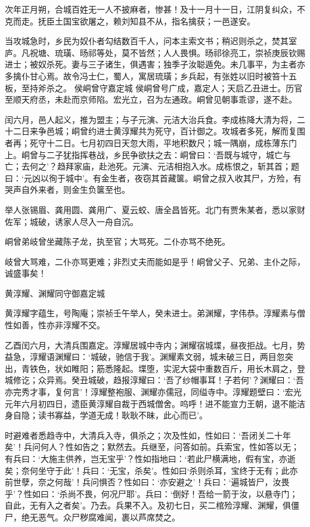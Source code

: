 \documentclass[]{article}
\begin{document}
次年正月朔，合城百姓无一人不披麻者，惨甚！及十一月十一日，江阴复纠众，不克而走。抚臣土国宝欲屠之，赖刘知县不从，指名擒获；一邑遂安。

当攻城急时，乡民为奴仆者勾结数百千人，问本主索文书；稍迟则杀之，焚其室庐。凡祝塘、琉璜、旸祁等处，莫不皆然；人人畏惧。旸祁徐亮工，崇祯庚辰钦赐进士；被奴杀死。妻与三子诸生，俱遇害；独季子汝聪遁免。未几事平，为主者亦多擒仆甘心焉。故令冯士仁，蜀人，寓居琉璜；乡兵起，有张姓以旧时被笞十五板，至持斧杀之。
侯峒曾守嘉定城
侯峒曾号广成，嘉定人；天启乙丑进士。历官至顺天府丞，未赴而京师陷。宏光立，召为左通政。峒曾见朝事乖谬，遂不赴。

闰六月，邑人起义，推为盟主；与子元演、元洁大治兵食。李成栋降大清为将，二十二日来争邑城；峒曾约进士黄淳耀共为死守，百计御之。攻城者多死，解而复围者再；死守十二日。七月初四日天忽大雨，平地积数尺；城一隅崩，成栋薄东门上。峒曾与二子犹指挥巷战，乡民争欲扶之去：峒曾曰：`吾既与城守，城亡与亡；去何之'？趋拜家庙，赴池死。元演、元洁相抱入水。成栋恨之，斩其首；题曰：`元凶以徇于城中'。有金生者，夜窃其首藏箧。峒曾之叔入收其尸，方殓，有哭声自外来者，则金生负箧至也。

举人张锡眉、龚用圆、龚用广、夏云蛟、唐全昌皆死。北门有贾朱某者，悉以家财佐军；城破，诱家人尽入一舟自沉。

峒曾弟岐曾坐藏陈子龙，执至官；大骂死。二仆亦骂不绝死。

岐曾大骂难，二仆亦骂更难；非烈丈夫而能如是乎！峒曾父子、兄弟、主仆之际，诚盛事矣！

黄淳耀、渊耀同守御嘉定城

黄淳耀字蕴生，号陶庵；崇祯壬午举人，癸未进士。弟渊耀，字伟恭。淳耀素与僧性如善，性亦非淳耀不交。

乙酉闰六月，大清兵围嘉定。淳耀居城中寺内；渊耀宿城堞，昼夜拒战。七月，势益急，淳耀语渊耀曰：`城破，驰信于我'。渊耀素文弱，城未破三日，两目忽突出，青铁色，状如睢阳；筋悉隆起。堞堕，实泥大袋中重数百斤，用长木肩之，登城修讫；众异焉。癸丑城破，趋报淳耀曰：`吾了纱帽事耳！子若何'？渊耀曰：`吾亦完秀才事，复何言'！淳耀整袍服、渊耀亦儒冠，同缢寺中。淳耀题壁曰：`宏光元年六月初四日，遗臣黄淳耀自裁于西城僧舍。呜呼！进不能宣力王朝，退不能洁身自隐；读书寡益，学道无成！耿耿不昧，此心而已'。

时避难者悉趋寺中，大清兵入寺，俱杀之；次及性如，性如曰：`吾闭关二十年矣'！兵问何人？性如告之；默然去。兵继至，问答如前。兵索宝，性如答以无；有兵曰：`大施主供养，岂无宝乎'？性如指地曰：`若此尸横满地，假有宝，亦逝矣；奈何坐守于此'！兵曰：`无宝，杀矣'。性如曰`杀则杀耳，宝终于无有；此亦前世孽，奈之何哉'！兵问惧否？性如曰：`亦安避之'！兵曰：`遍城皆尸，汝畏乎'？性如曰：`杀尚不畏，何况尸耶'。兵曰：`倒好！吾给一箭于汝，以悬寺门；自此，无有入之者矣'。乃去。兵果不入。及初七日，买二棺殓淳耀、渊耀，俱僵尸，绝无恶气。众尸秽腐难闻，裹以芦席焚之。
\end{document}
